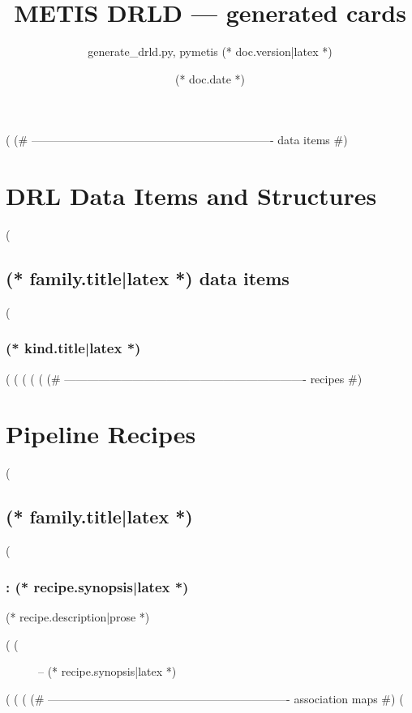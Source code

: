 \documentclass[11pt,oneside,a4paper]{article}
\title{METIS DRLD --- generated cards}
\author{generate\_drld.py, pymetis (* doc.version|latex *)}
\date{(* doc.date *)}
\begin{document}
\maketitle
\tableofcontents
\clearpage

\clearpage
(%
(# ---------------------------------------------------------------- data items #)
\section{DRL Data Items and Structures}\label{sec:drl_data_structures}
(%
\subsection{(* family.title|latex *) data items}
(%
\subsubsection{(* kind.title|latex *)}
(%
(%
(%
(%
(%
(# ---------------------------------------------------------------- recipes #)
\clearpage
\section{Pipeline Recipes}\label{sec:pipeline_recipes}
(%
\subsection{(* family.title|latex *)}
(%
\subsubsection{: (* recipe.synopsis|latex *)}\label{rec:(* recipe.name *)}
(* recipe.description|prose *)

(%
(%
\begin{figure}[hb]
  \centering
    \def \globalscale {0.700000}
    \fontsize{10}{12}\selectfont
    
  \caption[Recipe: ]{ -- (* recipe.synopsis|latex *)}
  \label{fig:(* recipe.name *)}
\end{figure}
(%
(%
(%
(# ---------------------------------------------------------------- association maps #)
(%
\clearpage
\end{document}
